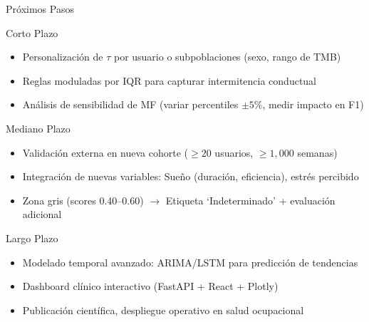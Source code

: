 \documentclass[aspectratio=169]{beamer}
\begin{document}

\begin{frame}{Próximos Pasos}

\begin{block}{Corto Plazo}
\begin{itemize}
    \item Personalización de $\tau$ por usuario o subpoblaciones (sexo, rango de TMB)
    \item Reglas moduladas por IQR para capturar intermitencia conductual
    \item Análisis de sensibilidad de MF (variar percentiles $\pm 5\%$, medir impacto en F1)
\end{itemize}
\end{block}

\begin{block}{Mediano Plazo}
\begin{itemize}
    \item Validación externa en nueva cohorte ($\geq 20$ usuarios, $\geq 1,000$ semanas)
    \item Integración de nuevas variables: Sueño (duración, eficiencia), estrés percibido
    \item Zona gris (scores 0.40--0.60) $\rightarrow$ Etiqueta `Indeterminado' + evaluación adicional
\end{itemize}
\end{block}

\begin{block}{Largo Plazo}
\begin{itemize}
    \item Modelado temporal avanzado: ARIMA/LSTM para predicción de tendencias
    \item Dashboard clínico interactivo (FastAPI + React + Plotly)
    \item Publicación científica, despliegue operativo en salud ocupacional
\end{itemize}
\end{block}

\end{frame}

\end{document}

